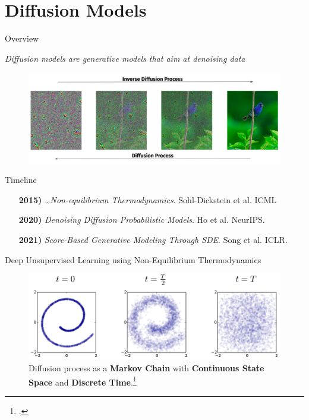 \documentclass[aspectratio=169, 10pt]{beamer}
\theoremstyle{definition}
\begin{document}
\section{Diffusion Models}
\begin{frame}{Overview}
  \begin{center}
    \it
    Diffusion models are generative models that aim at denoising data
  \end{center}
  \begin{figure}[h!]
    \centering
    \includegraphics[scale=0.2]{./pic/diffusion_intro.png}
  \end{figure}
\end{frame}
\begin{frame}{Timeline}
\begin{enumerate}
  \item[\bf 2015)] \textit{\ldots Non-equilibrium Thermodynamics}. Sohl-Dickstein
    et al. ICML\vfill
  \item[\bf 2020)] \textit{Denoising Diffusion Probabilistic Models}.
  Ho et al. NeurIPS.\vfill
  \item[\bf 2021)] \textit{Score-Based Generative Modeling Through SDE}. Song et
    al. ICLR.
\end{enumerate}
\end{frame}
\begin{frame}{Deep Unsupervised Learning using Non-Equilibrium Thermodynamics}
  \begin{figure}[h!]
    \centering
    \includegraphics[scale=.23]{./pic/thermodynimc.png}
    \caption{Diffusion process as a \textbf{Markov Chain} with \textbf{Continuous
    State Space} and \textbf{Discrete Time}.\footcite{thermodynamic}}
  \end{figure}
\end{frame}
\end{document}
